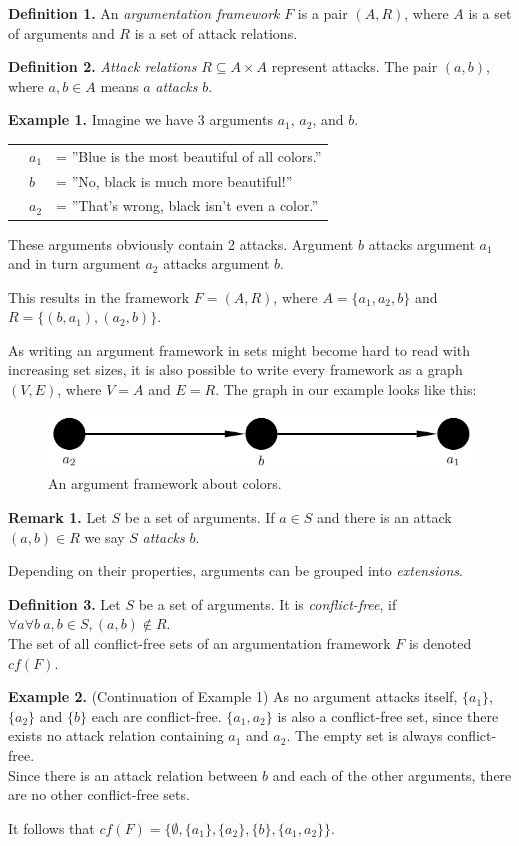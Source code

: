 \documentclass[draft,final]{vutinfth} %
\newcommand{\hl}{\par\medskip}
\newcommand{\dl}{\par\bigskip}
\begin{document}
\textbf{Definition 1.} An \emph{argumentation framework} $F$ is a pair $(A,R)$, where $A$ is a set of arguments and $R$ is a set of attack relations.\dl

\textbf{Definition 2.} \emph{Attack relations} $R\subseteq A\times A$ represent attacks. The pair $(a,b)$, where $a,b\in A$ means $a$ \emph{attacks} $b$.\dl

\textbf{Example 1.} Imagine we have 3 arguments $a_1$, $a_2$, and $b$.\hl
			\begin{tabular}{p{0.5cm}p{0.5cm}l}
			& $a_1$ & = ''Blue is the most beautiful of all colors.''\\
			& $b$ & = ''No, black is much more beautiful!''\\
			& $a_2$ & = ''That's wrong, black isn't even a color.''
			\end{tabular}\hl
These arguments obviously contain 2 attacks. Argument $b$ attacks argument $a_1$ and in turn argument $a_2$ attacks argument $b$.\hl
This results in the framework $F=(A,R)$, where $A=\{a_1,a_2,b\}$ and $R=\{(b,a_1),(a_2,b)\}$.\dl
As writing an argument framework in sets might become hard to read with increasing set sizes, it is also possible to write every framework as a graph $(V,E)$, where $V=A$ and $E=R$. The graph in our example looks like this:\dl

\FloatBarrier
	\begin{figure}[!htb]
		\centering
		\includegraphics[width=\linewidth]{graphs/ex1.pdf}
		\caption{An argument framework about colors.}
	\end{figure}
\FloatBarrier

\textbf{Remark 1.} Let $S$ be a set of arguments. If $a\in S$ and there is an attack $(a,b)\in R$ we say $S$ \emph{attacks} $b$.\dl

Depending on their properties, arguments can be grouped into \emph{extensions}.\dl

\textbf{Definition 3.} Let $S$ be a set of arguments. It is \emph{conflict-free}, if $\forall a \forall b\ a,b\in S, (a,b)\notin R$.\\
The set of all conflict-free sets of an argumentation framework $F$ is denoted $cf(F)$.\dl

\textbf{Example 2.} (Continuation of Example 1) As no argument attacks itself, $\{a_1\}$, $\{a_2\}$ and $\{b\}$ each are conflict-free. $\{a_1,a_2\}$ is also a conflict-free set, since there exists no attack relation containing $a_1$ and $a_2$. The empty set is always conflict-free.\\
Since there is an attack relation between $b$ and each of the other arguments, there are no other conflict-free sets.\hl
It follows that $cf(F)=\{\emptyset,\{a_1\},\{a_2\},\{b\},\{a_1,a_2\}\}$.\dl
\end{document}

